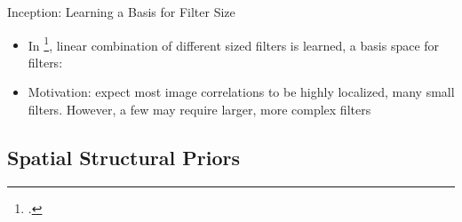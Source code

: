 \documentclass[t,xcolor=dvipsnames]{beamer}
\begin{document}
\begin{frame}{Inception: Learning a Basis for Filter Size}{}
\begin{itemize}
   \item In \footcite{Szegedy2014going}, linear combination of different sized filters is learned, \ie a basis space for filters:
\end{itemize}
    
\begin{itemize}
    \item Motivation: expect most image correlations to be highly localized, \ie many small filters. However, a few may require larger, more complex filters
\end{itemize}
\end{frame}
\subsection{Spatial Structural Priors}

\end{document}
